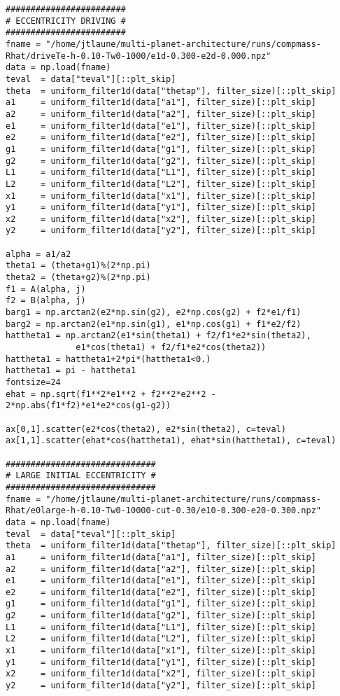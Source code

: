 \documentclass[11pt]{article}
\begin{document}
\begin{verbatim}
########################
# ECCENTRICITY DRIVING #
########################
fname = "/home/jtlaune/multi-planet-architecture/runs/compmass-Rhat/driveTe-h-0.10-Tw0-1000/e1d-0.300-e2d-0.000.npz"
data = np.load(fname)
teval  = data["teval"][::plt_skip]
theta  = uniform_filter1d(data["thetap"], filter_size)[::plt_skip]
a1     = uniform_filter1d(data["a1"], filter_size)[::plt_skip]
a2     = uniform_filter1d(data["a2"], filter_size)[::plt_skip]
e1     = uniform_filter1d(data["e1"], filter_size)[::plt_skip]     
e2     = uniform_filter1d(data["e2"], filter_size)[::plt_skip]
g1     = uniform_filter1d(data["g1"], filter_size)[::plt_skip]     
g2     = uniform_filter1d(data["g2"], filter_size)[::plt_skip]
L1     = uniform_filter1d(data["L1"], filter_size)[::plt_skip]     
L2     = uniform_filter1d(data["L2"], filter_size)[::plt_skip]
x1     = uniform_filter1d(data["x1"], filter_size)[::plt_skip]     
y1     = uniform_filter1d(data["y1"], filter_size)[::plt_skip]
x2     = uniform_filter1d(data["x2"], filter_size)[::plt_skip]     
y2     = uniform_filter1d(data["y2"], filter_size)[::plt_skip]

alpha = a1/a2
theta1 = (theta+g1)%(2*np.pi)
theta2 = (theta+g2)%(2*np.pi)
f1 = A(alpha, j)
f2 = B(alpha, j)
barg1 = np.arctan2(e2*np.sin(g2), e2*np.cos(g2) + f2*e1/f1)
barg2 = np.arctan2(e1*np.sin(g1), e1*np.cos(g1) + f1*e2/f2)
hattheta1 = np.arctan2(e1*sin(theta1) + f2/f1*e2*sin(theta2),
		      e1*cos(theta1) + f2/f1*e2*cos(theta2))
hattheta1 = hattheta1+2*pi*(hattheta1<0.)
hattheta1 = pi - hattheta1
fontsize=24
ehat = np.sqrt(f1**2*e1**2 + f2**2*e2**2 - 2*np.abs(f1*f2)*e1*e2*cos(g1-g2))

ax[0,1].scatter(e2*cos(theta2), e2*sin(theta2), c=teval)
ax[1,1].scatter(ehat*cos(hattheta1), ehat*sin(hattheta1), c=teval)

##############################
# LARGE INITIAL ECCENTRICITY #
##############################
fname = "/home/jtlaune/multi-planet-architecture/runs/compmass-Rhat/e0large-h-0.10-Tw0-10000-cut-0.30/e10-0.300-e20-0.300.npz"
data = np.load(fname)
teval  = data["teval"][::plt_skip]
theta  = uniform_filter1d(data["thetap"], filter_size)[::plt_skip]
a1     = uniform_filter1d(data["a1"], filter_size)[::plt_skip]
a2     = uniform_filter1d(data["a2"], filter_size)[::plt_skip]
e1     = uniform_filter1d(data["e1"], filter_size)[::plt_skip]     
e2     = uniform_filter1d(data["e2"], filter_size)[::plt_skip]
g1     = uniform_filter1d(data["g1"], filter_size)[::plt_skip]     
g2     = uniform_filter1d(data["g2"], filter_size)[::plt_skip]
L1     = uniform_filter1d(data["L1"], filter_size)[::plt_skip]     
L2     = uniform_filter1d(data["L2"], filter_size)[::plt_skip]
x1     = uniform_filter1d(data["x1"], filter_size)[::plt_skip]     
y1     = uniform_filter1d(data["y1"], filter_size)[::plt_skip]
x2     = uniform_filter1d(data["x2"], filter_size)[::plt_skip]     
y2     = uniform_filter1d(data["y2"], filter_size)[::plt_skip]


\end{verbatim}
\end{document}
